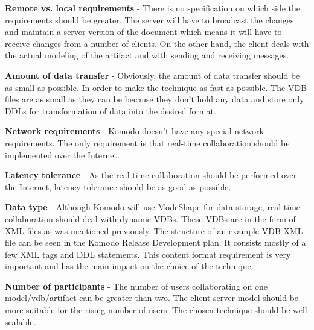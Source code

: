\documentclass[12pt,oneside]{fithesis2}
\begin{document}
\vspace{3mm} 

\textbf{Remote vs. local requirements} - There is no specification on which side the requirements should be greater. The server will have to broadcast the changes and maintain a server version of the document which means it will have to receive changes from a number of clients. On the other hand, the client deals with the actual modeling of the artifact and with sending and receiving messages.

\vspace{3mm} 

\textbf{Amount of data transfer} - Obviously, the amount of data transfer should be as small as possible. In order to make the technique as fast as possible. The VDB files are as small as they can be because they don't hold any data and store only DDLs for transformation of data into the desired format.

\vspace{3mm} 

\textbf{Network requirements} - Komodo doesn't have any special network requirements. The only requirement is that real-time collaboration should be implemented over the Internet.

\vspace{3mm} 

\textbf{Latency tolerance} - As the real-time collaboration should be performed over the Internet, latency tolerance should be as good as possible.

\vspace{3mm} 

\textbf{Data type} - Although Komodo will use ModeShape for data storage, real-time collaboration should deal with dynamic VDBs. These VDBs are in the form of XML files as was mentioned previously. The structure of an example VDB XML file can be seen in the Komodo Release Development plan\cite{Komodo}. It consists mostly of a few XML tags and DDL statements. This content format requirement is very important and has the main impact on the choice of the technique.

\vspace{3mm} 

\textbf{Number of participants} - The number of users collaborating on one model/vdb/artifact can be greater than two. The client-server model should be more suitable for the rising number of users. The chosen technique should be well scalable.

\vspace{3mm} 
\end{document}
